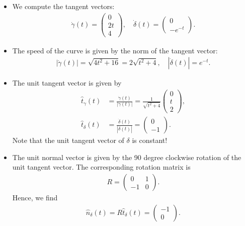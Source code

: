 \documentclass[11pt]{article}
\begin{document}
\begin{solution}
    \begin{itemize}
        \item We compute the tangent vectors:
        \begin{align}
            \dot \gamma(t) = \begin{pmatrix} 0 \\ 2t \\ 4 \end{pmatrix}, \quad \dot \delta(t) = \begin{pmatrix} 0 \\ -e^{-t} \end{pmatrix}.
        \end{align}
        \item The speed of the curve is given by the norm of the tangent vector:
        \begin{align}
            |\dot \gamma(t)| = \sqrt{4t^2 + 16} = 2 \sqrt{t^2 + 4}, \quad |\dot \delta(t)| = e^{-t}.
        \end{align}
        \item The unit tangent vector is given by
        \begin{align}
            \hat t_\gamma(t) &= \frac{\dot \gamma(t)}{|\dot \gamma(t)|}  = \frac{1}{\sqrt{t^2 + 4}} \begin{pmatrix} 0 \\ t \\ 2 \end{pmatrix},\\
            \hat t_\delta(t) &= \frac{\dot \delta(t)}{|\dot \delta(t)|} = \begin{pmatrix} 0 \\ -1 \end{pmatrix}.
        \end{align}
        Note that the unit tangent vector of $\delta$ is constant!
        \item The unit normal vector is given by the 90 degree clockwise rotation of the unit tangent vector. The corresponding rotation matrix is
        \begin{align}
            R = \begin{pmatrix} 0 & 1 \\ -1 & 0 \end{pmatrix}.
        \end{align}
        Hence, we find
        \begin{align}
            \hat n_\delta(t) = R \hat t_\delta(t) = \begin{pmatrix} -1 \\ 0 \end{pmatrix}.

\end{align}
\end{itemize}
\end{solution}
\end{document}
